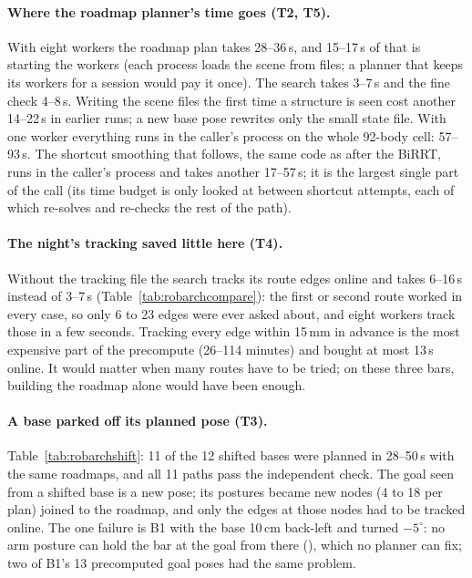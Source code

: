 \paragraph{Where the roadmap planner's time goes (T2, T5).} With eight workers the
roadmap plan takes 28--36\,s, and 15--17\,s of that is starting the workers (each
process loads the scene from files; a planner that keeps its workers for a session
would pay it once). The search takes 3--7\,s and the fine check 4--8\,s. Writing the
scene files the first time a structure is seen cost another 14--22\,s in earlier
runs; a new base pose rewrites only the small state file. With one worker
everything runs in the caller's process on the whole 92-body cell: 57--93\,s. The
shortcut smoothing that follows, the same code as after the BiRRT, runs in the
caller's process and takes another 17--57\,s; it is the largest single part of the
call (its time budget is only looked at between shortcut attempts, each of which
re-solves and re-checks the rest of the path).

\paragraph{The night's tracking saved little here (T4).} Without the tracking file
the search tracks its route edges online and takes 6--16\,s instead of 3--7\,s
(Table~\ref{tab:robarchcompare}): the first or second route worked in every case, so
only 6 to 23 edges were ever asked about, and eight workers track those in a few
seconds. Tracking every edge within 15\,mm in advance is the most expensive part of
the precompute (26--114 minutes) and bought at most 13\,s online. It would matter
when many routes have to be tried; on these three bars, building the roadmap
alone would have been enough.

\paragraph{A base parked off its planned pose (T3).} Table~\ref{tab:robarchshift}:
11 of the 12 shifted bases were planned in 28--50\,s with the same roadmaps, and all
11 paths pass the independent check. The goal seen from a shifted base is a new
pose; its postures became new nodes (4 to 18 per plan) joined to the roadmap, and
only the edges at those nodes had to be tracked online. The one failure is B1
with the base 10\,cm back-left and turned $-5^\circ$: no arm posture can hold the
bar at the goal from there (), which no planner can fix;
two of B1's 13 precomputed goal poses had the same problem.

